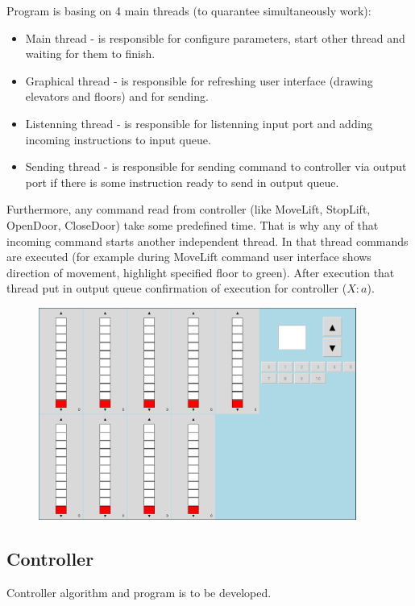 \documentclass[12pt]{article}
\begin{document}
Program is basing on 4 main threads (to quarantee simultaneously work): 
\begin{itemize}
	\item Main thread - is responsible for configure parameters, start other thread and waiting for them to finish.
	\item Graphical thread - is responsible for refreshing user interface (drawing elevators and floors) and for sending. 
	\item Listenning thread - is responsible for listenning input port and adding incoming instructions to input queue.
	\item Sending thread - is responsible for sending command to controller via output port if there is some instruction ready to send in output queue.		
\end{itemize}

Furthermore, any command read from controller (like MoveLift, StopLift, OpenDoor, CloseDoor) take some predefined time. That is why any of that incoming command starts another independent thread. In that thread commands are executed (for example during MoveLift command user interface shows direction of movement, highlight specified floor to green). After execution that thread put in output queue confirmation of execution for controller ($X:a$).
	\begin{figure}
	\includegraphics[width=0.93\textwidth]{img/winda.png}
	\end{figure}

\subsection{Controller}
Controller algorithm and program is to be developed.
\end{document}
